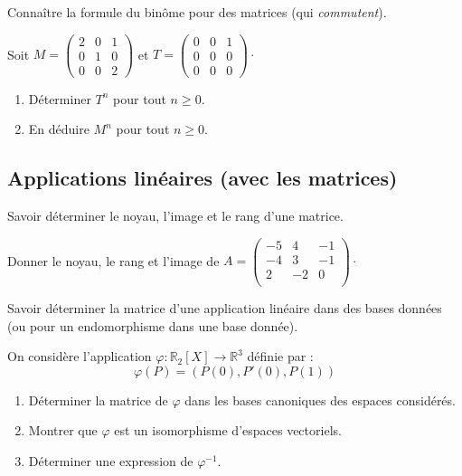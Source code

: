 \documentclass[a4paper,twoside,french,11pt]{VcCours}
\begin{document}
\begin{ptc}{}
	Connaître la formule du binôme pour des matrices (qui \textit{commutent}).
\end{ptc}

\begin{Exercice}{}
  Soit $M = \begin{pmatrix}
    2 & 0 & 1 \\
    0 & 1 & 0 \\
    0 & 0 & 2
  \end{pmatrix}$ et $T= \begin{pmatrix}
    0 & 0 & 1 \\
    0 & 0 & 0 \\
    0 & 0 & 0
  \end{pmatrix}\cdot$
  
  \begin{enumerate}
    \item Déterminer $T^n$ pour tout $n \geq 0$.
    \item En déduire $M^n$ pour tout $n \geq 0$.
  \end{enumerate}
\end{Exercice} 

\subsection{Applications linéaires (avec les matrices)}

\begin{ptc}{}
	Savoir déterminer le noyau, l'image et le rang d'une matrice.
\end{ptc} 

\begin{Exercice}{}
  Donner le noyau, le rang et l'image de $A = \begin{pmatrix}
    -5 & 4 & -1 \\
    -4 & 3 & - 1 \\
    2 	 & -2 & 0 \\
  \end{pmatrix}\cdot$
\end{Exercice} 
  
\begin{ptc}{}
	Savoir déterminer la matrice d'une application linéaire dans des bases données (ou pour un endomorphisme dans une base donnée).
\end{ptc}

\begin{Exercice}{}
  On considère l'application $\varphi : \mathbb{R}_2[X] \rightarrow \mathbb{R}^3$ définie par :
  \[ \varphi(P)=(P(0),P'(0),P(1)) \]
  
  \begin{enumerate}
    \item Déterminer la matrice de $\varphi$ dans les bases canoniques des espaces considérés.
    \item Montrer que $\varphi$ est un isomorphisme d'espaces vectoriels.
    \item Déterminer une expression de $\varphi^{-1}$.
  \end{enumerate}
\end{Exercice} 
\end{document}
